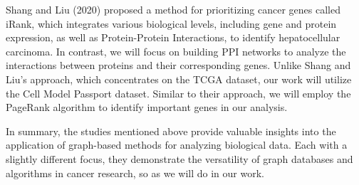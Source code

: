 Shang and Liu (2020) \cite{shan2020network} proposed a method for prioritizing cancer genes called iRank,
which integrates various biological levels, including gene and protein expression, as well as Protein-Protein Interactions,
to identify hepatocellular carcinoma.
In contrast, we will focus on building PPI networks to analyze the interactions between proteins and their corresponding genes.
Unlike Shang and Liu's approach, which concentrates on the TCGA dataset, our work will utilize the Cell Model Passport dataset.
Similar to their approach, we will employ the PageRank algorithm to identify important genes in our analysis.

In summary, the studies mentioned above provide valuable insights into the application of graph-based methods for analyzing biological data.
Each with a slightly different focus, they demonstrate the versatility of graph databases and algorithms in cancer research, so as we will do in our work.

\newline
